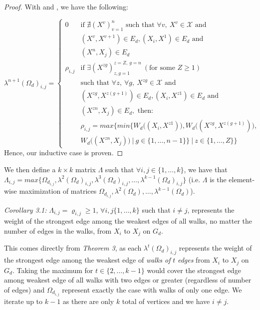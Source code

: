 \documentclass{article} %
\newcommand*\circled[1]{\tikz[baseline=(char.base)]{
            \node[shape=circle,draw,inner sep=2pt] (char) {#1};}}
\begin{document}
\begin{proof}
With \circled{1} and \circled{2}, we have the following:

\[
\lambda^{n+1}(\Omega_d)_{i,j}=
\begin{cases}
0 & \textrm{if } \nexists (X^v)_{v=1}^{n} \textrm{ such that } \forall v,\ X^v\in\mathcal{X}\textrm{ and } \\
  & (X^v,X^{v+1})\in E_d, (X_i,X^1)\in E_d \textrm{ and } \\
  & (X^{n},X_j)\in E_d\\ 
\rho_{i,j} & \textrm{if }\exists (X^{zg})_{z,g=1}^{z=Z,\ g=n}\ (\textrm{for some }Z\geq1) \\
  & \textrm{such that }\forall z,\ \forall g,\ X^{zg}\in\mathcal{X} \textrm{ and } \\
  & (X^{zg},X^{z(g+1)})\in E_d, (X_i, X^{z1})\in E_d \textrm{ and } \\
  & (X^{zn},X_j)\in E_d, \textrm{ then: } \\
  & \rho_{i,j}=max\Big\{min\big\{W_d\big((X_i,X^{z1})\big),W_d\big((X^{zg},X^{z(g+1)})\big), \\
  & W_d\big((X^{zn},X_j)\big)\ |\ g\in\{1,\ldots,n-1\}\big\}\ |\ z\in\{1,\ldots,Z\}\Big\}
\end{cases}
\]
Hence, our inductive case is proven.
\end{proof}

We then define a $k\times k$ matrix $\Lambda$ such that $\forall i,j\in\{1,\ldots,k\}$, we have that $\Lambda_{i,j}=max\{\Omega_{d_{i,j}},\lambda^2(\Omega_d)_{i,j},\lambda^3(\Omega_d)_{i,j},\ldots,\lambda^{k-1}(\Omega_d)_{i,j}\}$ (i.e. $\Lambda$ is the element-wise maximization of matrices $\Omega_{d_{i,j}},\lambda^2(\Omega_d),\ldots,\lambda^{k-1}(\Omega_d)$). 

\textit{Corollary 3.1:} $\Lambda_{i,j}=\varrho_{i,j}\geq1$, $\forall i,j\{1,\ldots,k\}$ such that $i\not=j$, represents the weight of the strongest edge among the weakest edges of all walks, no matter the number of edges in the walks, from $X_i$ to $X_j$ on $G_d$.

This comes directly from \textit{Theorem 3}, as each $\lambda^t(\Omega_d)_{i,j}$ represents the weight of the strongest edge among the weakest edge of \textit{walks of} $t$ \textit{edges} from $X_i$ to $X_j$ on $G_d$. Taking the maximum for $t\in\{2,\ldots,k-1\}$ would cover the strongest edge among weakest edge of all walks with two edges or greater (regardless of number of edges) and $\Omega_{d_{i,j}}$ represent exactly the case with walks of only one edge. We iterate up to $k-1$ as there are only $k$ total of vertices and we have $i\not=j$.
\end{document}
